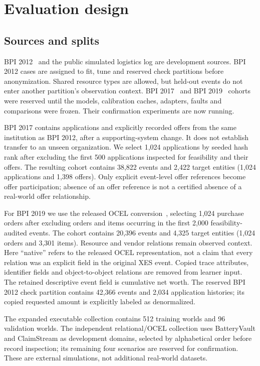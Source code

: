 \documentclass[11pt]{article}
\begin{document}
\section{Evaluation design}
\subsection{Sources and splits}
BPI 2012~\cite{bpi2012} and the public simulated logistics log are development sources. BPI 2012 cases are assigned to fit, tune and reserved check partitions before anonymization. Shared resource types are allowed, but held-out events do not enter another partition's observation context. BPI 2017~\cite{bpi2017} and BPI 2019~\cite{bpi2019} cohorts were reserved until the models, calibration caches, adapters, faults and comparisons were frozen. Their confirmation experiments are now running.

BPI 2017 contains applications and explicitly recorded offers from the same institution as BPI 2012, after a supporting-system change. It does not establish transfer to an unseen organization. We select 1,024 applications by seeded hash rank after excluding the first 500 applications inspected for feasibility and their offers. The resulting cohort contains 38,822 events and 2,422 target entities (1,024 applications and 1,398 offers). Only explicit event-level offer references become offer participation; absence of an offer reference is not a certified absence of a real-world offer relationship.

For BPI 2019 we use the released OCEL conversion~\cite{bpiconversion,bpiocel}, selecting 1,024 purchase orders after excluding orders and items occurring in the first 2,000 feasibility-audited events. The cohort contains 20,396 events and 4,325 target entities (1,024 orders and 3,301 items). Resource and vendor relations remain observed context. Here ``native'' refers to the released OCEL representation, not a claim that every relation was an explicit field in the original XES event. Copied trace attributes, identifier fields and object-to-object relations are removed from learner input. The retained descriptive event field is cumulative net worth. The reserved BPI 2012 check partition contains 42,366 events and 2,034 application histories; its copied requested amount is explicitly labeled as denormalized.

The expanded executable collection contains 512 training worlds and 96 validation worlds. The independent relational/OCEL collection uses BatteryVault and ClaimStream as development domains, selected by alphabetical order before record inspection; its remaining four scenarios are reserved for confirmation. These are external simulations, not additional real-world datasets.
\end{document}

